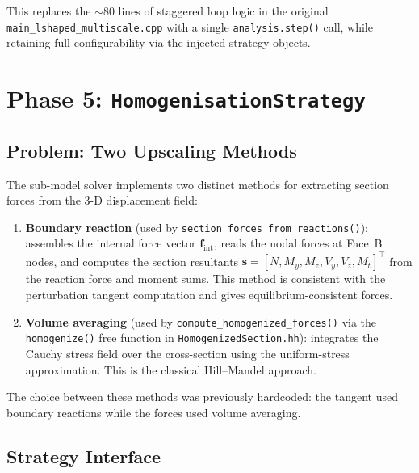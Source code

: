 This replaces the ${\sim}80$ lines of staggered loop logic in the
original \texttt{main\_lshaped\_multiscale.cpp} with a single
\texttt{analysis.step()} call, while retaining full configurability
via the injected strategy objects.


\section{Phase 5: \texttt{HomogenisationStrategy}}
\label{sec:refactor-homogenisation}

\subsection{Problem: Two Upscaling Methods}

The sub-model solver implements two distinct methods for extracting
section forces from the 3-D displacement field:

\begin{enumerate}
  \item \textbf{Boundary reaction} (used by
    \texttt{section\_forces\_from\_reactions()}):
    assembles the internal force vector $\mathbf{f}_{\mathrm{int}}$,
    reads the nodal forces at Face~B nodes, and computes the section
    resultants $\mathbf{s} = [N, M_y, M_z, V_y, V_z, M_t]^\top$
    from the reaction force and moment sums.  This method is
    consistent with the perturbation tangent computation and gives
    equilibrium-consistent forces.

  \item \textbf{Volume averaging} (used by
    \texttt{compute\_homogenized\_forces()} via the
    \texttt{homogenize()} free function in
    \texttt{HomogenizedSection.hh}):
    integrates the Cauchy stress field over the cross-section using
    the uniform-stress approximation.  This is the classical
    Hill--Mandel approach.
\end{enumerate}

The choice between these methods was previously hardcoded: the
tangent used boundary reactions while the forces used volume
averaging.

\subsection{Strategy Interface}

